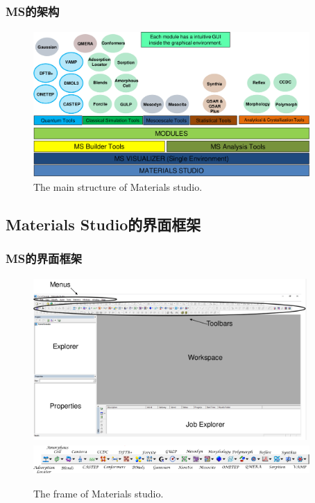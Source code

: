 
\frame
{
	\frametitle{\textrm{MS}的架构}
\begin{figure}[h!]
\centering
\vspace*{-0.10in}
\includegraphics[height=2.20in,width=4.15in,viewport=0 0 1275 667,clip]{Figures/MS-main_Struct.png}
\caption{\tiny \textrm{The main structure of Materials studio.}}%
\label{MS-main-structure}
\end{figure}
}

\subsection{\rm{Materials Studio}的界面框架}
\frame
{
	\frametitle{\textrm{MS}的界面框架}
\begin{figure}[h!]
\centering
\vspace*{-0.31in}
\includegraphics[height=2.45in,width=4.10in,viewport=0 0 1340 800,clip]{Figures/MS-Frame.png}
\includegraphics[height=0.45in,width=4.15in,viewport=0 0 1400 147,clip]{Figures/MS-Frame_calculators.png}
\caption{\tiny \textrm{The frame of Materials studio.}}%
\label{MS-Frame}
\end{figure}
}

